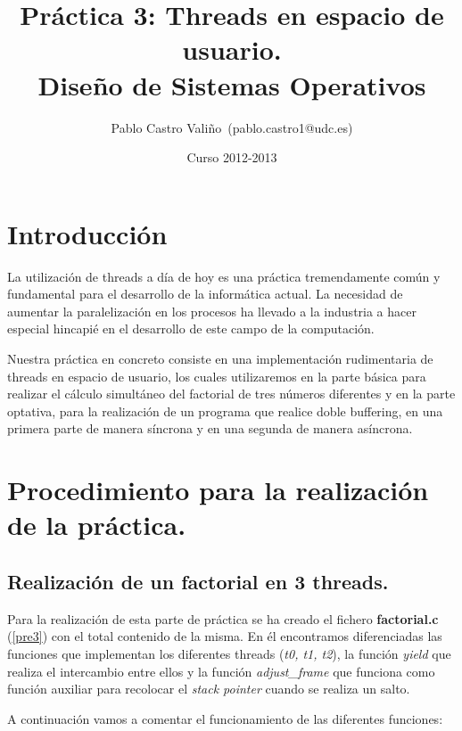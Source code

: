 \documentclass[12pt,a4paper,helvetica,titlepage]{article}
\title{\Huge{Práctica 3: Threads en espacio de usuario.} \\ \normalsize{Diseño de Sistemas Operativos}}
\author{Pablo Castro Valiño~(pablo.castro1@udc.es)}
\date{Curso 2012-2013}
\begin{document}
	
	
\maketitle

\newpage

\tableofcontents

\newpage

\section{Introducción}
La utilización de threads a día de hoy es una práctica tremendamente común y fundamental
para el desarrollo de la informática actual. La necesidad de aumentar la paralelización
en los procesos ha llevado a la industria a hacer especial hincapié en el desarrollo de
este campo de la computación.

Nuestra práctica en concreto consiste en una implementación rudimentaria de threads en
espacio de usuario, los cuales utilizaremos en la parte básica para realizar el cálculo
simultáneo del factorial de tres números diferentes y en la parte optativa, para la
realización de un programa que realice doble buffering, en una primera parte de manera
síncrona y en una segunda de manera asíncrona.

\section{Procedimiento para la realización de la práctica.}

\subsection{Realización de un factorial en 3 threads.}
Para la realización de esta parte de práctica se ha creado el fichero
\textbf{factorial.c} (\ref{pre3}) con el total contenido de la misma.
En él encontramos diferenciadas las funciones que implementan los diferentes threads
(\emph{t0, t1, t2}), la función \emph{yield} que realiza el intercambio entre ellos y la
función \emph{adjust\_frame} que funciona como función auxiliar para recolocar el
\emph{stack pointer} cuando se realiza un salto.

A continuación vamos a comentar el funcionamiento de las diferentes funciones:
\end{document}
